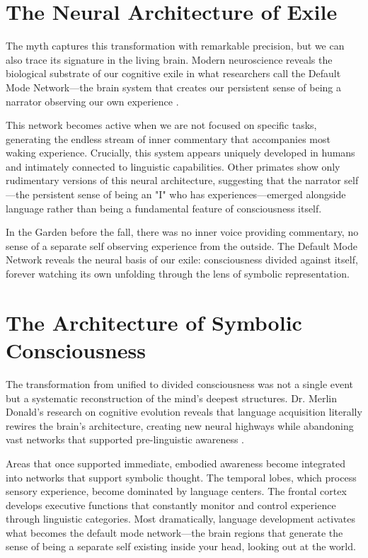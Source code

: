 \section{The Neural Architecture of Exile}

The myth captures this transformation with remarkable precision, but we can also trace its signature in the living brain. Modern neuroscience reveals the biological substrate of our cognitive exile in what researchers call the Default Mode Network—the brain system that creates our persistent sense of being a narrator observing our own experience \parencite{raichle2001default,buckner2008brain}.

This network becomes active when we are not focused on specific tasks, generating the endless stream of inner commentary that accompanies most waking experience. Crucially, this system appears uniquely developed in humans and intimately connected to linguistic capabilities. Other primates show only rudimentary versions of this neural architecture, suggesting that the narrator self—the persistent sense of being an "I" who has experiences—emerged alongside language rather than being a fundamental feature of consciousness itself.

In the Garden before the fall, there was no inner voice providing commentary, no sense of a separate self observing experience from the outside. The Default Mode Network reveals the neural basis of our exile: consciousness divided against itself, forever watching its own unfolding through the lens of symbolic representation.

\section{The Architecture of Symbolic Consciousness}

The transformation from unified to divided consciousness was not a single event but a systematic reconstruction of the mind's deepest structures. Dr. Merlin Donald's research on cognitive evolution reveals that language acquisition literally rewires the brain's architecture, creating new neural highways while abandoning vast networks that supported pre-linguistic awareness \parencite{donald1991origins}.

Areas that once supported immediate, embodied awareness become integrated into networks that support symbolic thought. The temporal lobes, which process sensory experience, become dominated by language centers. The frontal cortex develops executive functions that constantly monitor and control experience through linguistic categories. Most dramatically, language development activates what becomes the default mode network—the brain regions that generate the sense of being a separate self existing inside your head, looking out at the world.

